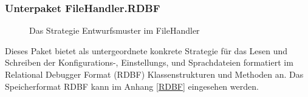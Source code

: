 \documentclass[parskip=full]{scrartcl}
\begin{document}
\subsubsection{Unterpaket FileHandler.RDBF}
\begin{figure}[!h]
\caption{Das Strategie Entwurfsmuster im FileHandler}
\label{fig:debuggerOverview}
\end{figure}

Dieses Paket bietet als untergeordnete konkrete Strategie für das Lesen und Schreiben der Konfigurations-, Einstellungs, und Sprachdateien formatiert im Relational Debugger Format (RDBF) Klassenstrukturen und Methoden an.
Das Speicherformat RDBF kann im Anhang \ref{RDBF} eingesehen werden.
\end{document}
